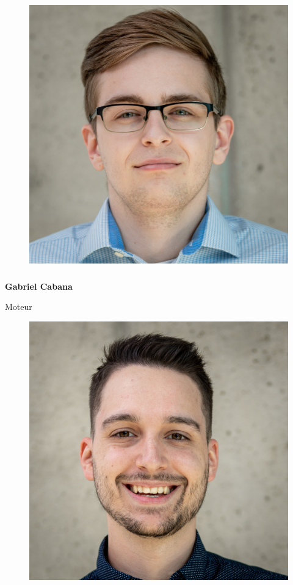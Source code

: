 \documentclass[a0paper,portrait]{baposter}
\begin{document}
\begin{poster}
{\begin{figure}
\includegraphics[width=.9\linewidth]{img/membres/Gabriel-Cabana-2.jpg} 
\end{figure}
\subsubsection*{}
\vspace{2mm}
\textbf{Gabriel Cabana}

Moteur

\begin{figure}
\includegraphics[width=.9\linewidth]{img/membres/Jérôme-Gelé-2.jpg} 
\end{figure}
}
\end{poster}
\end{document}
